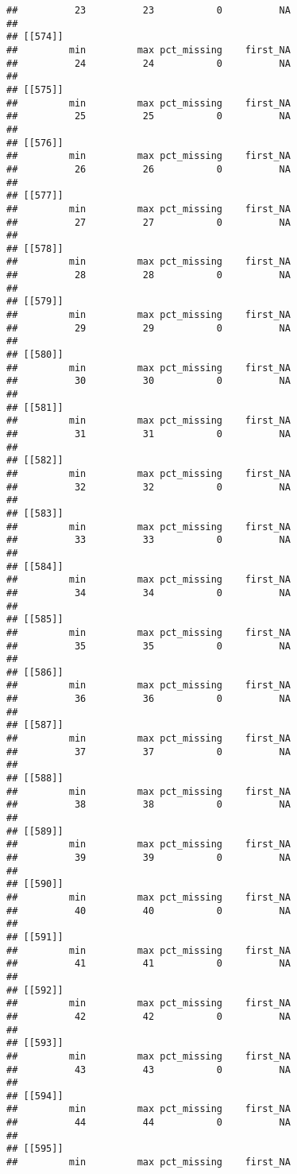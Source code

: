 \documentclass[
]{article}
\begin{document}
\begin{verbatim}
##          23          23           0          NA 
## 
## [[574]]
##         min         max pct_missing    first_NA 
##          24          24           0          NA 
## 
## [[575]]
##         min         max pct_missing    first_NA 
##          25          25           0          NA 
## 
## [[576]]
##         min         max pct_missing    first_NA 
##          26          26           0          NA 
## 
## [[577]]
##         min         max pct_missing    first_NA 
##          27          27           0          NA 
## 
## [[578]]
##         min         max pct_missing    first_NA 
##          28          28           0          NA 
## 
## [[579]]
##         min         max pct_missing    first_NA 
##          29          29           0          NA 
## 
## [[580]]
##         min         max pct_missing    first_NA 
##          30          30           0          NA 
## 
## [[581]]
##         min         max pct_missing    first_NA 
##          31          31           0          NA 
## 
## [[582]]
##         min         max pct_missing    first_NA 
##          32          32           0          NA 
## 
## [[583]]
##         min         max pct_missing    first_NA 
##          33          33           0          NA 
## 
## [[584]]
##         min         max pct_missing    first_NA 
##          34          34           0          NA 
## 
## [[585]]
##         min         max pct_missing    first_NA 
##          35          35           0          NA 
## 
## [[586]]
##         min         max pct_missing    first_NA 
##          36          36           0          NA 
## 
## [[587]]
##         min         max pct_missing    first_NA 
##          37          37           0          NA 
## 
## [[588]]
##         min         max pct_missing    first_NA 
##          38          38           0          NA 
## 
## [[589]]
##         min         max pct_missing    first_NA 
##          39          39           0          NA 
## 
## [[590]]
##         min         max pct_missing    first_NA 
##          40          40           0          NA 
## 
## [[591]]
##         min         max pct_missing    first_NA 
##          41          41           0          NA 
## 
## [[592]]
##         min         max pct_missing    first_NA 
##          42          42           0          NA 
## 
## [[593]]
##         min         max pct_missing    first_NA 
##          43          43           0          NA 
## 
## [[594]]
##         min         max pct_missing    first_NA 
##          44          44           0          NA 
## 
## [[595]]
##         min         max pct_missing    first_NA 

\end{verbatim}
\end{document}
